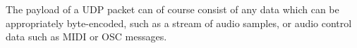 
%

The payload of a UDP packet can of course consist of any data which can be
appropriately byte-encoded, such as a stream of audio samples, or audio control
data such as MIDI or OSC messages.

